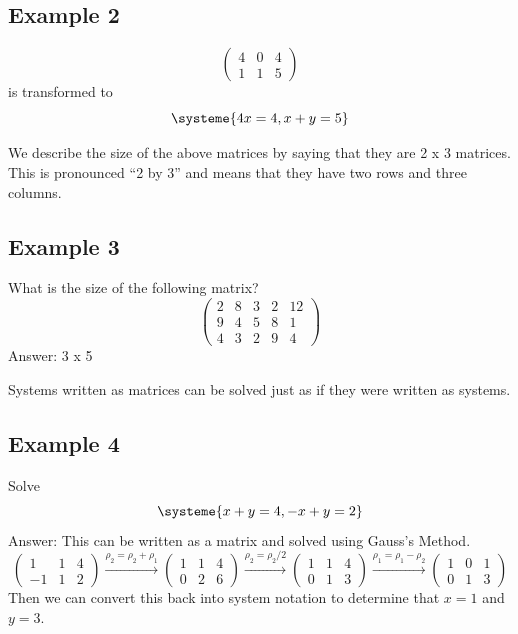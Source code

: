 \documentclass[a4paper,twoside,12pt]{memoir}  %
\begin{document}
\subsection{Example 2}
\begin{equation*}
\begin{pmatrix}
  4 & 0 & 4 \\
  1 & 1 & 5
\end{pmatrix}
\end{equation*}
is transformed to
\begin{equation*}
  \systeme{
    4x     = 4,
     x + y = 5
  }
\end{equation*}

We describe the size of the above matrices by saying that they are 2 x 3 matrices.
This is pronounced ``2 by 3'' and means that they have two rows and three columns.

\subsection{Example 3}
What is the size of the following matrix?
\begin{equation*}
  \begin{pmatrix}
    2 & 8 & 3 & 2 & 12 \\
    9 & 4 & 5 & 8 & 1 \\
    4 & 3 & 2 & 9 & 4
  \end{pmatrix}
\end{equation*}
Answer: 3 x 5

Systems written as matrices can be solved just as if they were written as systems.
\subsection{Example 4}
Solve
\begin{equation*}
  \systeme{ %
    x + y = 4,
   -x + y = 2
  }
\end{equation*}
Answer: This can be written as a matrix and solved using Gauss's Method.
\begin{equation*}
  \begin{pmatrix}
     1 & 1 & 4 \\
    -1 & 1 & 2
  \end{pmatrix}
  \xrightarrow{\rho_2 = \rho_2 + \rho_1}
  \begin{pmatrix}
     1 & 1 & 4 \\
     0 & 2 & 6
  \end{pmatrix}
  \xrightarrow{\rho_2 = \rho_2/2}
  \begin{pmatrix}
     1 & 1 & 4 \\
     0 & 1 & 3
  \end{pmatrix}
  \xrightarrow{\rho_1 = \rho_1 - \rho_2}
  \begin{pmatrix}
     1 & 0 & 1 \\
     0 & 1 & 3
  \end{pmatrix}
\end{equation*}
Then we can convert this back into system notation to determine that $x=1$ and $y=3$.
\end{document}
